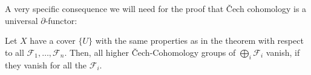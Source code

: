 A very specific consequence we will need for the proof that \v{C}ech cohomology is a universal $\partial$-functor:

\begin{corollary}%
  \label{chech-coefficient-sum}
  Let $X$ have a cover $\{U\}$ with the same properties as in the theorem with respect to all $\mathcal F_1,\dots,\mathcal F_n$.
  Then, all higher \v{C}ech-Cohomology groups of $\bigoplus_{i}\mathcal F_i$ vanish,
  if they vanish for all the $\mathcal F_i$.
\end{corollary}
